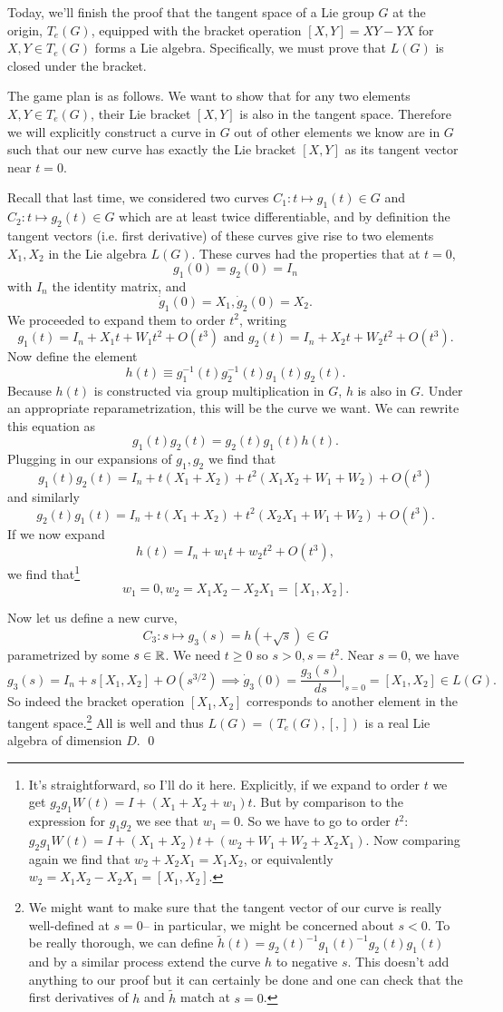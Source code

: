Today, we'll finish the proof that the tangent space of a Lie group $G$ at the origin, $T_e(G)$, equipped with the bracket operation $[X,Y]=XY-YX$ for $X,Y\in T_e(G)$ forms a Lie algebra. Specifically, we must prove that $L(G)$ is closed under the bracket. 

The game plan is as follows. We want to show that for any two elements $X,Y\in T_e(G)$, their Lie bracket $[X,Y]$ is also in the tangent space. Therefore we will explicitly construct a curve in $G$ out of other elements we know are in $G$ such that our new curve has exactly the Lie bracket $[X,Y]$ as its tangent vector near $t=0$.

Recall that last time, we considered two curves $C_1: t\mapsto g_1(t) \in G$ and $C_2: t\mapsto g_2(t)\in G$ which are at least twice differentiable, and by definition the tangent vectors (i.e. first derivative) of these curves give rise to two elements $X_1,X_2$ in the Lie algebra $L(G)$. These curves had the properties that at $t=0$, $$g_1(0)=g_2(0)=I_n$$ with $I_n$ the identity matrix, and $$\dot g_1(0)=X_1,\dot g_2(0)=X_2.$$ We proceeded to expand them to order $t^2$, writing
$$g_1(t)=I_n+X_1 t+W_1 t^2+O(t^3)\text{ and }g_2(t)=I_n+X_2 t+W_2 t^2+O(t^3).$$
Now define the element
$$h(t)\equiv g_1^{-1}(t) g_2^{-1}(t) g_1(t) g_2(t).$$
Because $h(t)$ is constructed via group multiplication in $G$, $h$ is also in $G$. Under an appropriate reparametrization, this will be the curve we want. We can rewrite this equation as
$$g_1(t) g_2(t)= g_2(t) g_1(t)h(t).$$
Plugging in our expansions of $g_1,g_2$ we find that
$$g_1(t)g_2(t)= I_n+t(X_1+X_2)+t^2(X_1X_2 +W_1+W_2)+O(t^3)$$
and similarly
$$g_2(t)g_1(t)= I_n+t(X_1+X_2)+t^2(X_2X_1 +W_1+W_2)+O(t^3).$$
If we now expand $$h(t)=I_n+w_1 t+ w_2 t^2+O(t^3),$$
we find that\footnote{It's straightforward, so I'll do it here. Explicitly, if we expand to order $t$ we get $g_2g_1 W(t)=I+(X_1+X_2+w_1)t$. But by comparison to the expression for $g_1g_2$ we see that $w_1=0$. So we have to go to order $t^2$: $g_2g_1 W(t)=I+(X_1+X_2)t+(w_2+W_1+W_2+X_2X_1).$ Now comparing again we find that $w_2+X_2X_1=X_1X_2$, or equivalently $w_2=X_1X_2-X_2X_1=[X_1,X_2]$.}
$$w_1=0, w_2= X_1X_2-X_2X_1=[X_1,X_2].$$

Now let us define a new curve,
$$C_3:s\mapsto g_3(s)=h(+\sqrt{s})\in G$$ parametrized by some $s\in \mathbb{R}$. We need $t\geq 0$ so $s>0, s=t^2$. Near $s=0$, we have
$$g_3(s)=I_n+s[X_1,X_2]+O(s^{3/2}) \implies \dot g_3(0)= \frac{g_3(s)}{ds}|_{s=0}=[X_1,X_2]\in L(G).$$
So indeed the bracket operation $[X_1,X_2]$ corresponds to another element in the tangent space.\footnote{We might want to make sure that the tangent vector of our curve is really well-defined at $s=0$-- in particular, we might be concerned about $s<0$. To be really thorough, we can define $\tilde h(t)=g_2(t)^{-1}g_1(t)^{-1}g_2(t)g_1(t)$ and by a similar process extend the curve $h$ to negative $s$. This doesn't add anything to our proof but it can certainly be done and one can check that the first derivatives of $h$ and $\tilde h$ match at $s=0$.} All is well and thus $L(G)=(T_e(G),[,])$ is a real Lie algebra of dimension $D$. \qed

